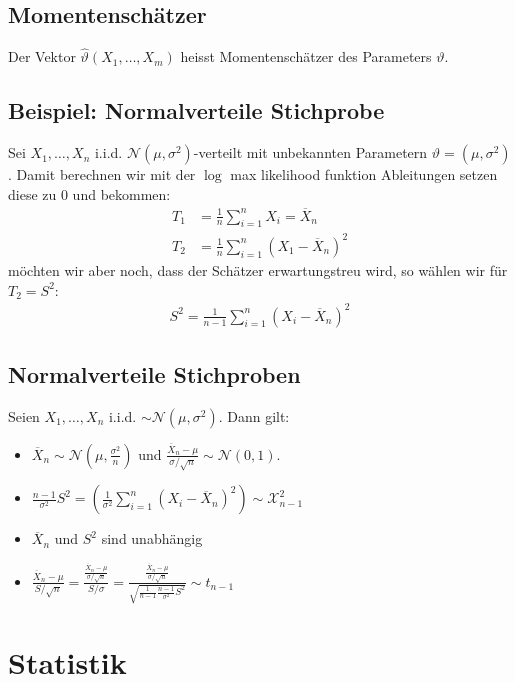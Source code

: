 \documentclass[8pt]{extarticle}
\newcommand{\vt}{\vartheta}
\newcommand{\Sn}{\sum_{i = 1}^n}
\newcommand{\zufallsvariablen}{X_1, \dots, X_n}
\newcommand{\Normalverteilt}{\mathcal{N}(\mu, \sigma^2)}
\newcommand{\Standardnormalverteilt}{\mathcal{N}(0, 1)}
\begin{document}
\begin{multicols*}{3}
  \subsection*{Momentenschätzer}
  Der Vektor $\hat{\vt}(X_1, \dots, X_m)$ heisst Momentenschätzer
  des Parameters $\vt$.
  \subsection*{Beispiel: Normalverteile Stichprobe}
  Sei $\zufallsvariablen$ i.i.d. $\Normalverteilt$-verteilt mit unbekannten
  Parametern $\vt = (\mu, \sigma^2)$. Damit berechnen wir mit der $\log$
  max likelihood funktion Ableitungen setzen diese zu $0$ und bekommen:
  \begin{align*}
    T_1 & = \frac{1}{n} \Sn X_i = \overline{X}_n     \\
    T_2 & = \frac{1}{n} \Sn (X_1 - \overline{X}_n)^2
  \end{align*}
  möchten wir aber noch, dass der Schätzer erwartungstreu wird,
  so wählen wir für $T_2 = S^2$:
  \begin{align*}
    S^2 = \frac{1}{n-1} \Sn (X_i - \overline{X}_n)^2
  \end{align*}
  \subsection*{Normalverteile Stichproben}
  Seien $\zufallsvariablen$ i.i.d. $\sim \Normalverteilt$. Dann gilt:
  \begin{itemize}
    \item $\overline{X}_n \sim \mathcal{N}(\mu, \frac{\sigma^2}{n})$
          und $\frac{\overline{X}_n - \mu}{\sigma / \sqrt{n}} \sim \Standardnormalverteilt$.
    \item $\frac{n-1}{\sigma^2} S^2 = \left( \frac{1}{\sigma^2} \Sn (X_i - \overline{X}_n)^2 \right) \sim \mathcal{X}^2_{n-1}$
    \item $\overline{X}_n$ und $S^2$ sind unabhängig
    \item $\frac{\overline{X}_n - \mu}{S / \sqrt{n}} = \frac{ \frac{\overline{X}_n - \mu}{\sigma / \sqrt{n}} }{S / \sigma} = \frac{ \frac{\overline{X}_n - \mu}{\sigma / \sqrt{n}} }{\sqrt{\frac{1}{n-1} \frac{n-1}{\sigma^2} S^2}} \sim t_{n-1}$
  \end{itemize}
  \hypertarget{sec:4}{\section{Statistik}}

\end{multicols*}
\end{document}
